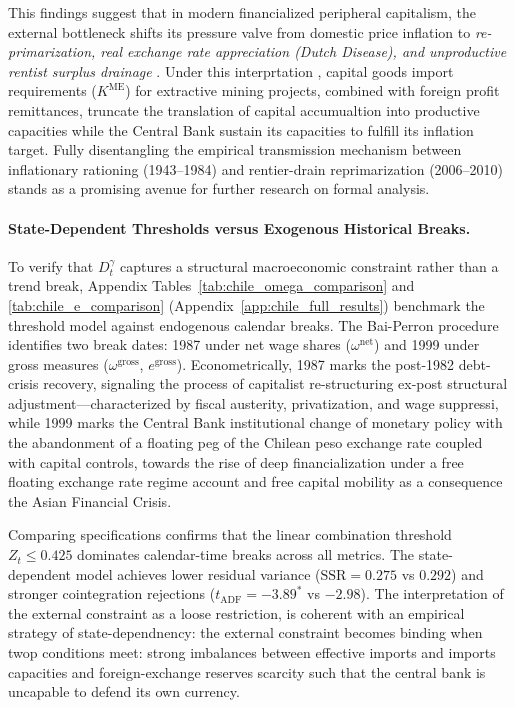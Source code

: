 This findings suggest that in modern financialized peripheral capitalism, the external bottleneck shifts its pressure valve from domestic price inflation to \textit{re-primarization, real exchange rate appreciation (Dutch Disease), and unproductive rentist surplus drainage} \citep{Palma2019,Ahumada2019}. Under this interprtation , capital goods import requirements ($K^{\text{ME}}$) for extractive mining projects, combined with foreign profit remittances, truncate the translation of capital accumualtion into productive capacities while the Central Bank sustain its capacities to fulfill its inflation target. Fully disentangling the empirical transmission mechanism between inflationary rationing (1943--1984) and rentier-drain reprimarization (2006--2010) stands as a promising avenue for further research on formal analysis.

 

\paragraph{State-Dependent Thresholds versus Exogenous Historical Breaks.} To verify that $D_t^\gamma$ captures a structural macroeconomic constraint rather than a trend break, Appendix Tables~\ref{tab:chile_omega_comparison} and \ref{tab:chile_e_comparison} (Appendix~\ref{app:chile_full_results}) benchmark the threshold model against \citet{BaiPerron2003} endogenous calendar breaks. The Bai-Perron procedure identifies two break dates: 1987 under net wage shares ($\omega^{\text{net}}$) and 1999 under gross measures ($\omega^{\text{gross}}$, $e^{\text{gross}}$). Econometrically, 1987 marks the post-1982 debt-crisis recovery, signaling the process of capitalist re-structuring ex-post structural adjustment—characterized by fiscal austerity, privatization, and wage suppressi, while 1999 marks the Central Bank institutional change of monetary policy with the abandonment of a floating peg of the Chilean peso exchange rate coupled with capital controls, towards the rise of deep financialization under a free floating exchange rate regime account and free capital mobility as a consequence the Asian Financial Crisis. 

Comparing specifications confirms that the linear combination threshold $Z_t \le 0.425$ dominates calendar-time breaks across all metrics. The state-dependent model achieves lower residual variance ($\text{SSR} = 0.275$ vs $0.292$) and stronger cointegration rejections ($t_{\text{ADF}} = -3.89^*$ vs $-2.98$). The interpretation of the external constraint as a loose restriction, is coherent with an empirical strategy of state-dependnency: the external constraint becomes binding when twop conditions meet: strong imbalances between effective imports and imports capacities and foreign-exchange reserves scarcity such that the central bank is uncapable to defend its own currency. 


